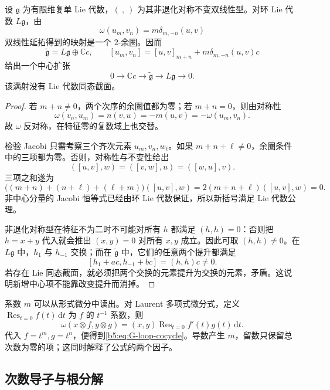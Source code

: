 \begin{proposition}\label{b5:prop:G-loop-cocycle}
	设 \(\mathfrak g\) 为有限维复单 Lie 代数，\((\ ,\ )\) 为其非退化对称不变双线性型。对环 Lie 代数 \(L\mathfrak g\)，由
	\begin{equation}\label{b5:eq:G-loop-cocycle}
		\omega(u_m,v_n)=m\delta_{m,-n}(u,v)
	\end{equation}
	双线性延拓得到的映射是一个 \(2\)-余圈。因而
	\[
		\widetilde{\mathfrak g}=L\mathfrak g\oplus\mathbb Cc,\qquad
		[u_m,v_n]=[u,v]_{m+n}+m\delta_{m,-n}(u,v)c
	\]
	给出一个中心扩张
	\[
		0\longrightarrow\mathbb Cc\longrightarrow\widetilde{\mathfrak g}
		\longrightarrow L\mathfrak g\longrightarrow0.
	\]
	该满射没有 Lie 代数同态截面。
\end{proposition}
\begin{proof}
	若 \(m+n\ne0\)，两个次序的余圈值都为零；若 \(m+n=0\)，则由对称性
	\[
		\omega(v_n,u_m)=n(v,u)=-m(u,v)=-\omega(u_m,v_n).
	\]
	故 \(\omega\) 反对称，在特征零的复数域上也交替。

	检验 Jacobi 只需考察三个齐次元素 \(u_m,v_n,w_\ell\)。如果 \(m+n+\ell\ne0\)，余圈条件中的三项都为零。否则，对称性与不变性给出
	\[
		([u,v],w)=([v,w],u)=([w,u],v).
	\]
	三项之和遂为
	\[
		\bigl((m+n)+(n+\ell)+(\ell+m)\bigr)([u,v],w)
		=2(m+n+\ell)([u,v],w)=0.
	\]
	非中心分量的 Jacobi 恒等式已经由环 Lie 代数保证，所以新括号满足 Lie 代数公理。

	非退化对称型在特征不为二时不可能对所有 \(h\) 都满足 \((h,h)=0\)：否则把 \(h=x+y\) 代入就会推出 \((x,y)=0\) 对所有 \(x,y\) 成立。因此可取 \((h,h)\ne0\)。在 \(L\mathfrak g\) 中，\(h_1\) 与 \(h_{-1}\) 交换；而在 \(\widetilde{\mathfrak g}\) 中，它们的任意两个提升都满足
	\[
		[h_1+ac,h_{-1}+bc]=(h,h)c\ne0.
	\]
	若存在 Lie 同态截面，就必须把两个交换的元素提升为交换的元素，矛盾。这说明新增中心项不能靠改变提升而消掉。
\end{proof}

系数 \(m\) 可以从形式微分中读出。对 Laurent 多项式微分式，定义 \(\operatorname{Res}_{t=0}f(t)\,\mathrm dt\) 为 \(f\) 的 \(t^{-1}\) 系数，则
\[
	\omega(x\otimes f,y\otimes g)
	=(x,y)\operatorname{Res}_{t=0}f'(t)g(t)\,\mathrm dt.
\]
代入 \(f=t^m,g=t^n\)，便得到\eqref{b5:eq:G-loop-cocycle}。导数产生 \(m\)，留数只保留总次数为零的项；这同时解释了公式的两个因子。

\subsection{次数导子与根分解}
\label{b5:subsec:G02:03}

